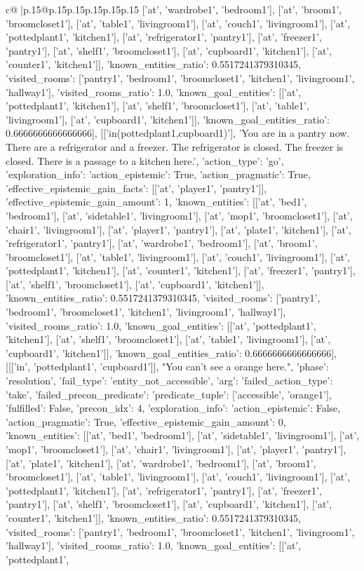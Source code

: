 \documentclass{article}
\begin{document}
{\begin{supertabular}{c@{$\;$}|p{.15\linewidth}@{}p{.15\linewidth}p{.15\linewidth}p{.15\linewidth}p{.15\linewidth}p{.15\linewidth}}
{{{['at', 'wardrobe1', 'bedroom1'], ['at', 'broom1', 'broomcloset1'], ['at', 'table1', 'livingroom1'], ['at', 'couch1', 'livingroom1'], ['at', 'pottedplant1', 'kitchen1'], ['at', 'refrigerator1', 'pantry1'], ['at', 'freezer1', 'pantry1'], ['at', 'shelf1', 'broomcloset1'], ['at', 'cupboard1', 'kitchen1'], ['at', 'counter1', 'kitchen1']], 'known_entities_ratio': 0.5517241379310345, 'visited_rooms': ['pantry1', 'bedroom1', 'broomcloset1', 'kitchen1', 'livingroom1', 'hallway1'], 'visited_rooms_ratio': 1.0, 'known_goal_entities': [['at', 'pottedplant1', 'kitchen1'], ['at', 'shelf1', 'broomcloset1'], ['at', 'table1', 'livingroom1'], ['at', 'cupboard1', 'kitchen1']], 'known_goal_entities_ratio': 0.6666666666666666}}], [['in(pottedplant1,cupboard1)'], 'You are in a pantry now. There are a refrigerator and a freezer. The refrigerator is closed. The freezer is closed. There is a passage to a kitchen here.', {'action_type': 'go', 'exploration_info': {'action_epistemic': True, 'action_pragmatic': True, 'effective_epistemic_gain_facts': [['at', 'player1', 'pantry1']], 'effective_epistemic_gain_amount': 1, 'known_entities': [['at', 'bed1', 'bedroom1'], ['at', 'sidetable1', 'livingroom1'], ['at', 'mop1', 'broomcloset1'], ['at', 'chair1', 'livingroom1'], ['at', 'player1', 'pantry1'], ['at', 'plate1', 'kitchen1'], ['at', 'refrigerator1', 'pantry1'], ['at', 'wardrobe1', 'bedroom1'], ['at', 'broom1', 'broomcloset1'], ['at', 'table1', 'livingroom1'], ['at', 'couch1', 'livingroom1'], ['at', 'pottedplant1', 'kitchen1'], ['at', 'counter1', 'kitchen1'], ['at', 'freezer1', 'pantry1'], ['at', 'shelf1', 'broomcloset1'], ['at', 'cupboard1', 'kitchen1']], 'known_entities_ratio': 0.5517241379310345, 'visited_rooms': ['pantry1', 'bedroom1', 'broomcloset1', 'kitchen1', 'livingroom1', 'hallway1'], 'visited_rooms_ratio': 1.0, 'known_goal_entities': [['at', 'pottedplant1', 'kitchen1'], ['at', 'shelf1', 'broomcloset1'], ['at', 'table1', 'livingroom1'], ['at', 'cupboard1', 'kitchen1']], 'known_goal_entities_ratio': 0.6666666666666666}}], [[['in', 'pottedplant1', 'cupboard1']], "You can't see a orange here.", {'phase': 'resolution', 'fail_type': 'entity_not_accessible', 'arg': {'failed_action_type': 'take', 'failed_precon_predicate': {'predicate_tuple': ['accessible', 'orange1'], 'fulfilled': False, 'precon_idx': 4}}, 'exploration_info': {'action_epistemic': False, 'action_pragmatic': True, 'effective_epistemic_gain_amount': 0, 'known_entities': [['at', 'bed1', 'bedroom1'], ['at', 'sidetable1', 'livingroom1'], ['at', 'mop1', 'broomcloset1'], ['at', 'chair1', 'livingroom1'], ['at', 'player1', 'pantry1'], ['at', 'plate1', 'kitchen1'], ['at', 'wardrobe1', 'bedroom1'], ['at', 'broom1', 'broomcloset1'], ['at', 'table1', 'livingroom1'], ['at', 'couch1', 'livingroom1'], ['at', 'pottedplant1', 'kitchen1'], ['at', 'refrigerator1', 'pantry1'], ['at', 'freezer1', 'pantry1'], ['at', 'shelf1', 'broomcloset1'], ['at', 'cupboard1', 'kitchen1'], ['at', 'counter1', 'kitchen1']], 'known_entities_ratio': 0.5517241379310345, 'visited_rooms': ['pantry1', 'bedroom1', 'broomcloset1', 'kitchen1', 'livingroom1', 'hallway1'], 'visited_rooms_ratio': 1.0, 'known_goal_entities': [['at', 'pottedplant1', }}}
\end{supertabular}}
\end{document}
